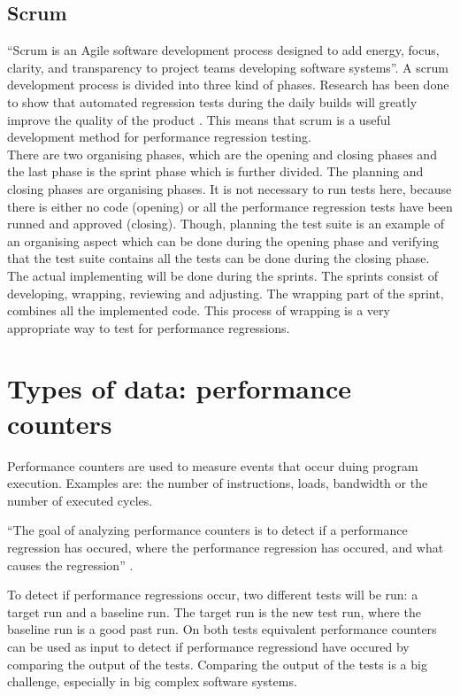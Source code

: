 \subsection{Scrum}
``Scrum is an Agile software development process designed to add energy, focus, clarity, and transparency to project teams developing software systems''\cite{sutherland2007distributed}. A scrum development process is divided into three kind of phases. Research has been done to show that automated regression tests during the daily builds will greatly improve the quality of the product \cite{Future_of_Scrum}. This means that scrum is a useful development method for performance regression testing. \\ There are two organising phases, which are the opening and closing phases and the last phase is the sprint phase which is further divided. The planning and closing phases are organising phases. It is not necessary to run tests here, because there is either no code (opening) or all the performance regression tests have been runned and approved (closing). Though, planning the test suite is an example of an organising aspect which can be done during the opening phase and verifying that the test suite contains all the tests can be done during the closing phase. \\ The actual implementing will be done during the sprints. The sprints consist of developing, wrapping, reviewing and adjusting. The wrapping part of the sprint, combines all the implemented code. This process of wrapping is a very appropriate way to test for performance regressions.

\section{Types of data: performance counters}
Performance counters are used to measure events that occur duing program execution\cite{PC}. Examples are: the number of instructions, loads, bandwidth or the number of executed cycles.

``The goal of analyzing performance counters is to detect if a performance regression has occured, where the performance regression has occured, and what causes the regression'' \cite{nguyen2012using}.

To detect if performance regressions occur, two different tests will be run: a target run and a baseline run. The target run is the new test run, where the baseline run is a good past run. On both tests equivalent performance counters can be used as input to detect if performance regressiond have occured by comparing the output of the tests. Comparing the output of the tests is a big challenge, especially in big complex software systems.

